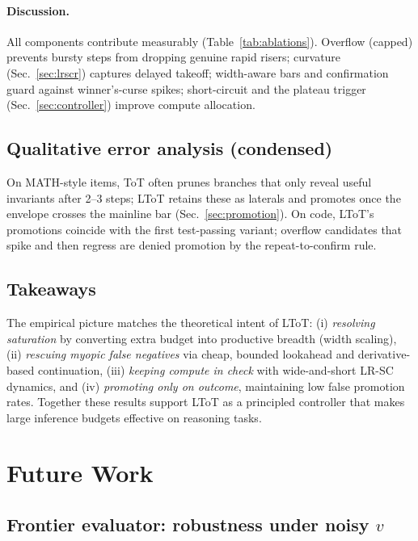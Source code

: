 \documentclass{article}
\begin{document}
\paragraph{Discussion.}
All components contribute measurably (Table~\ref{tab:ablations}).
Overflow (capped) prevents bursty steps from dropping genuine rapid risers; curvature (Sec.~\ref{sec:lrscr}) captures delayed takeoff; width-aware bars and confirmation guard against winner's-curse spikes; short-circuit and the plateau trigger (Sec.~\ref{sec:controller}) improve compute allocation.

\subsection{Qualitative error analysis (condensed)}
\label{subsec:qualitative}
On MATH-style items, ToT often prunes branches that only reveal useful invariants after 2--3 steps; LToT retains these as laterals and promotes once the envelope crosses the mainline bar (Sec.~\ref{sec:promotion}).
On code, LToT's promotions coincide with the first test-passing variant; overflow candidates that spike and then regress are denied promotion by the repeat-to-confirm rule.

\subsection{Takeaways}
\label{subsec:takeaways}
The empirical picture matches the theoretical intent of LToT:
(i) \emph{resolving saturation} by converting extra budget into productive breadth (width scaling),
(ii) \emph{rescuing myopic false negatives} via cheap, bounded lookahead and derivative-based continuation,
(iii) \emph{keeping compute in check} with wide-and-short LR-SC dynamics, and
(iv) \emph{promoting only on outcome}, maintaining low false promotion rates.
Together these results support LToT as a principled controller that makes large inference budgets effective on reasoning tasks.

\section{Future Work}
\label{section:future-work}


\subsection{Frontier evaluator: robustness under noisy $v$}
\label{subsec:frontier-results-noisy}
\end{document}

